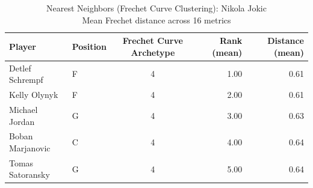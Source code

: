 \begin{table}[t]
\caption*{
{\fontsize{20}{25} Nearest Neighbors (Frechet Curve Clustering): Nikola Jokic\fontsize{12}{15}\selectfont } \\ 
{\fontsize{14}{17}\selectfont  Mean Frechet distance across 16 metrics\fontsize{12}{15}\selectfont }
} 
\fontsize{12.0pt}{14.0pt}\selectfont
\begin{tabular*}{\linewidth}{@{\extracolsep{\fill}}llcrr}
\toprule
Player & Position & Frechet Curve Archetype & Rank (mean) & Distance (mean) \\ 
\midrule\addlinespace[2.5pt]
Detlef Schrempf & F & 4 & 1.00 & 0.61 \\ 
Kelly Olynyk & F & 4 & 2.00 & 0.61 \\ 
Michael Jordan & G & 4 & 3.00 & 0.63 \\ 
Boban Marjanovic & C & 4 & 4.00 & 0.64 \\ 
Tomas Satoransky & G & 4 & 5.00 & 0.64 \\ 
\bottomrule
\end{tabular*}
\end{table}

